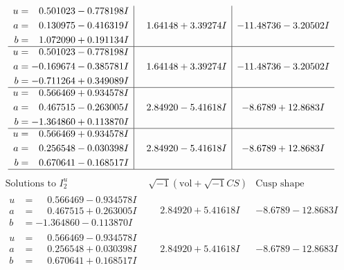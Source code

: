 \documentclass[1p]{elsarticle_modified}
\theoremstyle{definition}
\newcommand{\I}{\sqrt{-1}}
\begin{document}
$$\begin{array}{c|c|c}
\begin{aligned}
u &= \phantom{-}0.501023 - 0.778198 I \\
a &= \phantom{-}0.130975 - 0.416319 I \\
b &= \phantom{-}1.072090 + 0.191134 I\end{aligned}
 & \phantom{-}1.64148 + 3.39274 I & -11.48736 - 3.20502 I \\ \hline\begin{aligned}
u &= \phantom{-}0.501023 - 0.778198 I \\
a &= -0.169674 - 0.385781 I \\
b &= -0.711264 + 0.349089 I\end{aligned}
 & \phantom{-}1.64148 + 3.39274 I & -11.48736 - 3.20502 I \\ \hline\begin{aligned}
u &= \phantom{-}0.566469 + 0.934578 I \\
a &= \phantom{-}0.467515 - 0.263005 I \\
b &= -1.364860 + 0.113870 I\end{aligned}
 & \phantom{-}2.84920 - 5.41618 I & -8.6789 + 12.8683 I \\ \hline\begin{aligned}
u &= \phantom{-}0.566469 + 0.934578 I \\
a &= \phantom{-}0.256548 - 0.030398 I \\
b &= \phantom{-}0.670641 - 0.168517 I\end{aligned}
 & \phantom{-}2.84920 - 5.41618 I & -8.6789 + 12.8683 I\\
 \hline 
 \end{array}$$\newpage$$\begin{array}{c|c|c}  
\text{Solutions to }I^u_{2}& \I (\text{vol} + \sqrt{-1}CS) & \text{Cusp shape}\\
 \hline 
\begin{aligned}
u &= \phantom{-}0.566469 - 0.934578 I \\
a &= \phantom{-}0.467515 + 0.263005 I \\
b &= -1.364860 - 0.113870 I\end{aligned}
 & \phantom{-}2.84920 + 5.41618 I & -8.6789 - 12.8683 I \\ \hline\begin{aligned}
u &= \phantom{-}0.566469 - 0.934578 I \\
a &= \phantom{-}0.256548 + 0.030398 I \\
b &= \phantom{-}0.670641 + 0.168517 I\end{aligned}
 & \phantom{-}2.84920 + 5.41618 I & -8.6789 - 12.8683 I \\ \hline\begin{aligned}

\end{aligned}
\end{array}$$
\end{document}
